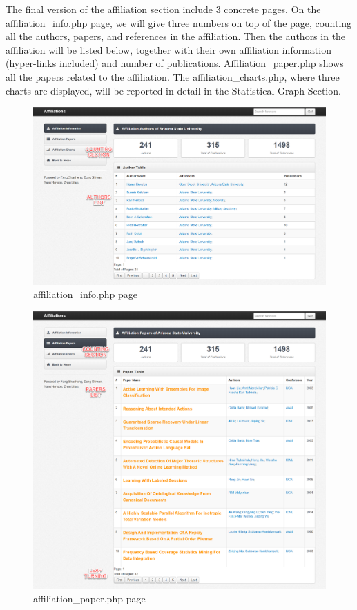 \documentclass{book}
\begin{document}
The final version of the affiliation section include 3 concrete pages. On the affiliation\_info.php page, we will give three numbers on top of the page, counting all the authors, papers, and references in the affiliation. Then the authors in the affiliation will be listed below, together with their own affiliation information (hyper-links included) and number of publications. Affiliation\_paper.php shows all the papers related to the affiliation. The affiliation\_charts.php, where three charts are displayed, will be reported in detail in the Statistical Graph Section.

\begin{figure}[H]
\centering
\includegraphics[scale=0.35]{img/zlt_aff_demo1.png}
\caption{affiliation\_info.php page}
\end{figure}

\begin{figure}[H]
\centering
\includegraphics[scale=0.35]{img/zlt_aff_demo2.png}
\caption{affiliation\_paper.php page}
\end{figure}
\end{document}
